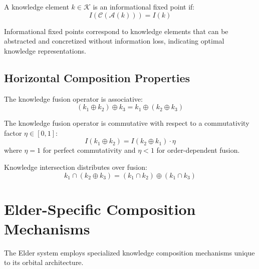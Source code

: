 \begin{theorem}
A knowledge element $k \in \mathcal{K}$ is an informational fixed point if:
\begin{equation}
I(\mathcal{C}(\mathcal{A}(k))) = I(k)
\end{equation}
\end{theorem}

\begin{corollary}
Informational fixed points correspond to knowledge elements that can be abstracted and concretized without information loss, indicating optimal knowledge representations.
\end{corollary}

\subsection{Horizontal Composition Properties}

\begin{theorem}
The knowledge fusion operator is associative:
\begin{equation}
(k_1 \oplus k_2) \oplus k_3 = k_1 \oplus (k_2 \oplus k_3)
\end{equation}
\end{theorem}

\begin{theorem}
The knowledge fusion operator is commutative with respect to a commutativity factor $\eta \in [0, 1]$:
\begin{equation}
I(k_1 \oplus k_2) = I(k_2 \oplus k_1) \cdot \eta
\end{equation}
where $\eta = 1$ for perfect commutativity and $\eta < 1$ for order-dependent fusion.
\end{theorem}

\begin{theorem}
Knowledge intersection distributes over fusion:
\begin{equation}
k_1 \cap (k_2 \oplus k_3) = (k_1 \cap k_2) \oplus (k_1 \cap k_3)
\end{equation}
\end{theorem}

\section{Elder-Specific Composition Mechanisms}

The Elder system employs specialized knowledge composition mechanisms unique to its orbital architecture.

